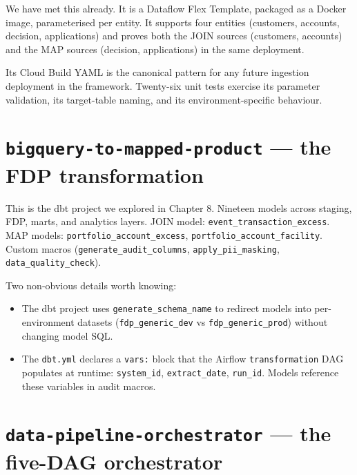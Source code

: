 \documentclass[
  11pt,
  british,
  oneside]{book}
\providecommand{\tightlist}{%
  \setlength{\itemsep}{0pt}\setlength{\parskip}{0pt}}
\begin{document}
We have met this already. It is a Dataflow Flex Template, packaged as a
Docker image, parameterised per entity. It supports four entities
(customers, accounts, decision, applications) and proves both the JOIN
sources (customers, accounts) and the MAP sources (decision,
applications) in the same deployment.

Its Cloud Build YAML is the canonical pattern for any future ingestion
deployment in the framework. Twenty-six unit tests exercise its
parameter validation, its target-table naming, and its
environment-specific behaviour.

\hypertarget{bigquery-to-mapped-product-the-fdp-transformation}{%
\section{\texorpdfstring{\texttt{bigquery-to-mapped-product} --- the FDP
transformation}{bigquery-to-mapped-product --- the FDP transformation}}\label{bigquery-to-mapped-product-the-fdp-transformation}}

This is the dbt project we explored in Chapter 8. Nineteen models across
staging, FDP, marts, and analytics layers. JOIN model:
\texttt{event\_transaction\_excess}. MAP models:
\texttt{portfolio\_account\_excess},
\texttt{portfolio\_account\_facility}. Custom macros
(\texttt{generate\_audit\_columns}, \texttt{apply\_pii\_masking},
\texttt{data\_quality\_check}).

Two non-obvious details worth knowing:

\begin{itemize}
\tightlist
\item
  The dbt project uses \texttt{generate\_schema\_name} to redirect
  models into per-environment datasets (\texttt{fdp\_generic\_dev} vs
  \texttt{fdp\_generic\_prod}) without changing model SQL.
\item
  The \texttt{dbt.yml} declares a \texttt{vars:} block that the Airflow
  \texttt{transformation} DAG populates at runtime: \texttt{system\_id},
  \texttt{extract\_date}, \texttt{run\_id}. Models reference these
  variables in audit macros.
\end{itemize}

\hypertarget{data-pipeline-orchestrator-the-five-dag-orchestrator}{%
\section{\texorpdfstring{\texttt{data-pipeline-orchestrator} --- the
five-DAG
orchestrator}{data-pipeline-orchestrator --- the five-DAG orchestrator}}\label{data-pipeline-orchestrator-the-five-dag-orchestrator}}
\end{document}
